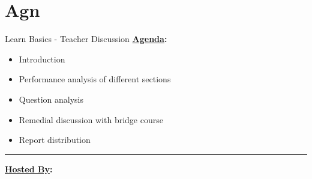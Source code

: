 \label{1.1.2 Agenda and Presenter Note}

\renewcommand{\insertschoolname}{Vivegaa School}
\section{Agn}

\begin{frame}{Learn Basics - Teacher Discussion}
\vspace{-7mm}
\textbf{\underline{Agenda}:}
\vspace{2mm}
\begin{itemize}
\item Introduction
\item Performance analysis of different sections
\item Question analysis
\item Remedial discussion with bridge course
\item Report distribution
\end{itemize}

\rule{\linewidth}{0.1pt}
\textcolor{headingColor}{\textbf{\underline{Hosted By}:}}\\
\noindent
\thaarun \nagarjun


\end{frame}


%

